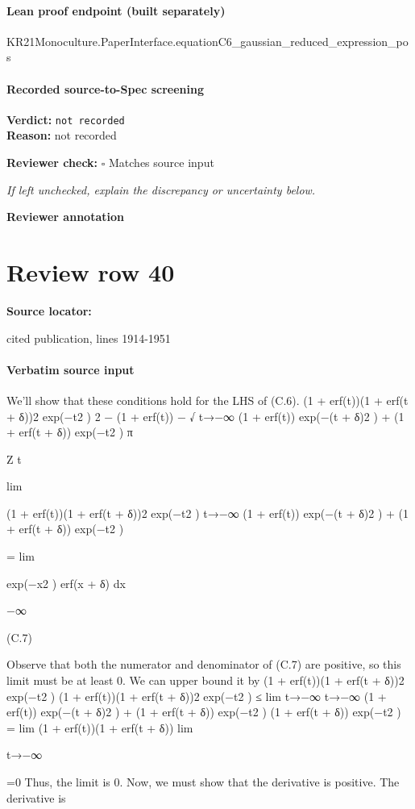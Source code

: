 \documentclass[10pt]{article}
\newcommand{\reviewerbox}{%
  \par\noindent\fbox{\parbox{0.96\linewidth}{\rule{0pt}{0.38in}}}\par
}
\newcommand{\reviewmatch}[1]{%
  \par\noindent\textbf{Reviewer check:} $\square$\; #1\par
  \noindent\emph{If left unchecked, explain the discrepancy or uncertainty below.}\par
}
\begin{document}
\paragraph{Lean proof endpoint (built separately)}\begin{ReviewVerbatim}
KR21Monoculture.PaperInterface.equationC6_gaussian_reduced_expression_pos
\end{ReviewVerbatim}

\paragraph{Recorded source-to-Spec screening}
\textbf{Verdict:} \texttt{not recorded}
\\
\textbf{Reason:} not recorded
\reviewmatch{Matches source input}
\noindent\textbf{Reviewer annotation}\par
\reviewerbox
\clearpage
\hypertarget{source-claim-4d39c9a7a45156fa}{}
\section*{Review row 40}
\textbf{Source locator:} {\footnotesize\raggedright cited publication, lines 1914-\allowbreak{}1951\par}
\paragraph{Verbatim source input}
\begin{ReviewVerbatim}
We’ll show that these conditions hold for the LHS of (C.6).
(1 + erf(t))(1 + erf(t + δ))2 exp(−t2 )
2
− (1 + erf(t)) − √
t→−∞ (1 + erf(t)) exp(−(t + δ)2 ) + (1 + erf(t + δ)) exp(−t2 )
π

Z t

lim

(1 + erf(t))(1 + erf(t + δ))2 exp(−t2 )
t→−∞ (1 + erf(t)) exp(−(t + δ)2 ) + (1 + erf(t + δ)) exp(−t2 )

= lim

exp(−x2 ) erf(x + δ) dx

−∞

(C.7)

Observe that both the numerator and denominator of (C.7) are positive, so this limit must be at least 0.
We can upper bound it by
(1 + erf(t))(1 + erf(t + δ))2 exp(−t2 )
(1 + erf(t))(1 + erf(t + δ))2 exp(−t2 )
≤
lim
t→−∞
t→−∞ (1 + erf(t)) exp(−(t + δ)2 ) + (1 + erf(t + δ)) exp(−t2 )
(1 + erf(t + δ)) exp(−t2 )
= lim (1 + erf(t))(1 + erf(t + δ))
lim

t→−∞

=0
Thus, the limit is 0. Now, we must show that the derivative is positive. The derivative is
\end{ReviewVerbatim}
\end{document}
